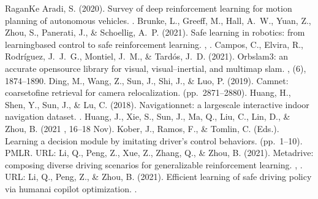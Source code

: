 \documentclass[letterpaper,10pt,english]{sphinxmanual}
\begin{document}
\begin{sphinxthebibliography}{Ragan\sphinxhyphen{}Ke}
\sphinxAtStartPar
Aradi, S. (2020). Survey of deep reinforcement learning for motion planning of autonomous vehicles. .
\sphinxAtStartPar
Brunke, L., Greeff, M., Hall, A. W., Yuan, Z., Zhou, S., Panerati, J., \& Schoellig, A. P. (2021). Safe learning in robotics: from learning\sphinxhyphen{}based control to safe reinforcement learning. , .
\sphinxAtStartPar
Campos, C., Elvira, R., Rodríguez, J. J. G., Montiel, J. M., \& Tardós, J. D. (2021). Orb\sphinxhyphen{}slam3: an accurate open\sphinxhyphen{}source library for visual, visual–inertial, and multimap slam. , (6), 1874–1890.
\sphinxAtStartPar
Ding, M., Wang, Z., Sun, J., Shi, J., \& Luo, P. (2019). Camnet: coarse\sphinxhyphen{}to\sphinxhyphen{}fine retrieval for camera re\sphinxhyphen{}localization.  (pp. 2871–2880).
\sphinxAtStartPar
Huang, H., Shen, Y., Sun, J., \& Lu, C. (2018). Navigationnet: a large\sphinxhyphen{}scale interactive indoor navigation dataset. .
\sphinxAtStartPar
Huang, J., Xie, S., Sun, J., Ma, Q., Liu, C., Lin, D., \& Zhou, B. (2021 , 16–18 Nov). Kober, J., Ramos, F., \& Tomlin, C. (Eds.). Learning a decision module by imitating driver’s control behaviors.  (pp. 1–10). PMLR. URL: 
\sphinxAtStartPar
Li, Q., Peng, Z., Xue, Z., Zhang, Q., \& Zhou, B. (2021). Metadrive: composing diverse driving scenarios for generalizable reinforcement learning. , . URL: 
\sphinxAtStartPar
Li, Q., Peng, Z., \& Zhou, B. (2021). Efficient learning of safe driving policy via human\sphinxhyphen{}ai copilot optimization. .

\end{sphinxthebibliography}
\end{document}
